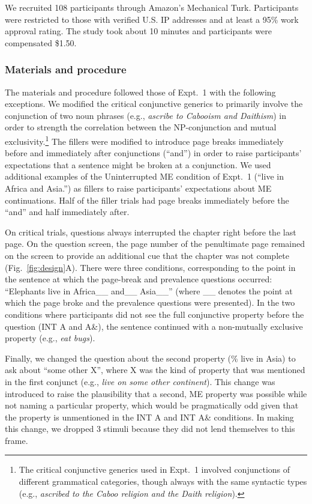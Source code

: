 \documentclass[10pt,letterpaper]{article}
\begin{document}
We recruited 108 participants through Amazon's Mechanical Turk.
Participants were restricted to those with verified U.S. IP addresses and at least a 95\% work approval rating. 
The study took about 10 minutes and participants were compensated \$1.50.

\subsubsection{Materials and procedure}

The materials and procedure  followed those of Expt.~1 with the following exceptions.
We modified the critical conjunctive generics to primarily involve the conjunction of two noun phrases (e.g., \emph{ascribe to Cabooism and Daithism}) in order to strength the correlation between the NP-conjunction and mutual exclusivity.\footnote{
The critical conjunctive generics used in Expt.~1 involved conjunctions of different grammatical categories, though always with the same syntactic types (e.g., \emph{ascribed to the Caboo religion and the Daith religion}).
}
The fillers were modified to introduce page breaks immediately before and immediately after conjunctions (``and'') in order to raise participants' expectations that a sentence might be broken at a conjunction.
We used additional examples of the Uninterrupted ME condition of Expt.~1 (``live in Africa and Asia.'') as fillers to raise participants' expectations about ME continuations.
Half of the filler trials had page breaks immediately before the ``and'' and half immediately after.

On critical trials, questions always interrupted the chapter right before the last page.
On the question screen, the page number of the penultimate page remained on the screen to provide an additional cue that the chapter was not complete (Fig.~\ref{fig:design}A).
There were three conditions, corresponding to the point in the sentence at which the page-break and prevalence questions occurred: ``Elephants live in Africa\_\_ and\_\_ Asia\_\_'' (where \_\_ denotes the point at which the page broke and the prevalence questions were presented).
In the two conditions where participants did not see the full conjunctive property before the question (INT A and A\&), the sentence continued with a non-mutually exclusive property (e.g., \emph{eat bugs}). 

Finally, we changed the question about the second property (\% live in Asia) to ask about ``some other X'', where X was the kind of property that was mentioned in the first conjunct (e.g., \emph{live on some other continent}).
This change was introduced to raise the plausibility that a second, ME property was possible while not  naming a particular property, which would be pragmatically odd given that the property is unmentioned in the INT A and INT A\& conditions. 
In making this change, we dropped 3 stimuli because they did not lend themselves to this frame.
\end{document}
